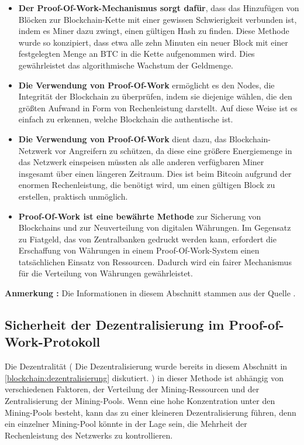 \begin{itemize}
	\item \textbf{Der Proof-Of-Work-Mechanismus sorgt dafür}, dass das Hinzufügen von Blöcken zur Blockchain-Kette mit einer gewissen Schwierigkeit verbunden ist, indem es Miner dazu zwingt, einen gültigen Hash zu finden. Diese Methode wurde so konzipiert, dass etwa alle zehn Minuten ein neuer Block mit einer festgelegten Menge an BTC in die Kette aufgenommen wird. Dies gewährleistet das algorithmische Wachstum der Geldmenge.
	\item \textbf{Die Verwendung von Proof-Of-Work} ermöglicht es den Nodes, die Integrität der Blockchain zu überprüfen, indem sie diejenige wählen, die den größten Aufwand in Form von Rechenleistung darstellt. Auf diese Weise ist es einfach zu erkennen, welche Blockchain die authentische ist.
	\item \textbf{Die Verwendung von Proof-Of-Work} dient dazu, das Blockchain-Netzwerk vor Angreifern zu schützen, da diese eine größere Energiemenge in das Netzwerk einspeisen müssten als alle anderen verfügbaren Miner insgesamt über einen längeren Zeitraum. Dies ist beim Bitcoin aufgrund der enormen Rechenleistung, die benötigt wird, um einen gültigen Block zu erstellen, praktisch unmöglich.
	\item \textbf{Proof-Of-Work ist eine bewährte Methode} zur Sicherung von Blockchains und zur Neuverteilung von digitalen Währungen. Im Gegensatz zu Fiatgeld, das von Zentralbanken gedruckt werden kann, erfordert die Erschaffung von Währungen in einem Proof-Of-Work-System einen tatsächlichen Einsatz von Ressourcen. Dadurch wird ein fairer Mechanismus für die Verteilung von Währungen gewährleistet.
\end{itemize}
\textbf{Anmerkung : } Die Informationen in diesem Abschnitt stammen aus der Quelle \cite{btc-echo-proof-of-work}.
\subsection{Sicherheit der Dezentralisierung im Proof-of-Work-Protokoll}
Die Dezentralität ( Die Dezentralisierung wurde bereits in diesem Abschnitt in \cref{blockchain:dezentralisierung} diskutiert. ) in dieser Methode ist abhängig von verschiedenen Faktoren,   der Verteilung der Mining-Ressourcen und der Zentralisierung der Mining-Pools. Wenn eine hohe Konzentration unter den Mining-Pools besteht, kann das zu einer kleineren Dezentralisierung führen, denn ein einzelner Mining-Pool könnte in der Lage sein, die Mehrheit der Rechenleistung des Netzwerks zu kontrollieren.
